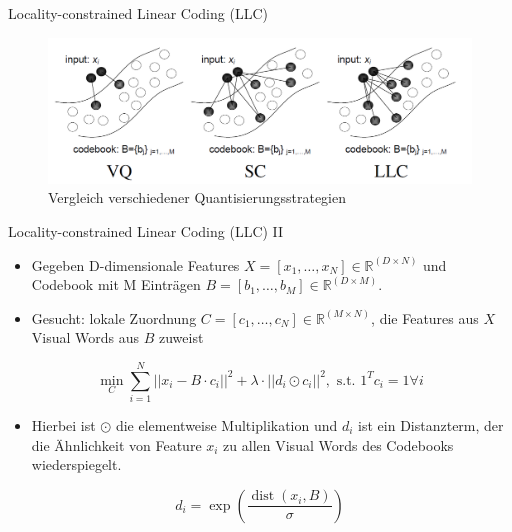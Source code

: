 \begin{frame}[t, fragile]{Locality-constrained Linear Coding (LLC)}
	\begin{figure}
		\centering
		\includegraphics[scale=0.7]{img/quant_comp.png}
		\caption{Vergleich verschiedener Quantisierungsstrategien \cite{wyylhg10}}
	\end{figure}
\end{frame}

\begin{frame}[t, fragile]{Locality-constrained Linear Coding (LLC) II}
	\begin{itemize}
		\item Gegeben D-dimensionale Features $X = [x_1, \dots, x_N] \in \mathbb{R}^{(D \times N)}$ und Codebook mit M Einträgen $B = [b_1, \dots, b_M] \in \mathbb{R}^{(D \times M)}$. 
		\item Gesucht: lokale Zuordnung $C = [c_1, \dots, c_N] \in \mathbb{R}^{(M \times N)}$, die Features aus $X$ Visual Words aus $B$ zuweist  
	\end{itemize}	 
	\begin{equation}
		\min_C \sum_{i=1}^{N} ||x_i - B\cdot c_i||^2 + \lambda\cdot ||d_i \odot c_i||^2, \text{ s.t. } 1^Tc_i = 1 \forall i
	\end{equation}
	\begin{itemize}
		\item Hierbei ist $\odot$ die elementweise Multiplikation und $d_i$ ist ein Distanzterm, der die Ähnlichkeit von Feature $x_i$ zu allen Visual Words des Codebooks wiederspiegelt.
	\end{itemize}
	\begin{equation}
		d_i = \exp \left( \frac{ \mathop{dist}(x_i, B)}{\sigma} \right)
	\end{equation}
\end{frame}

